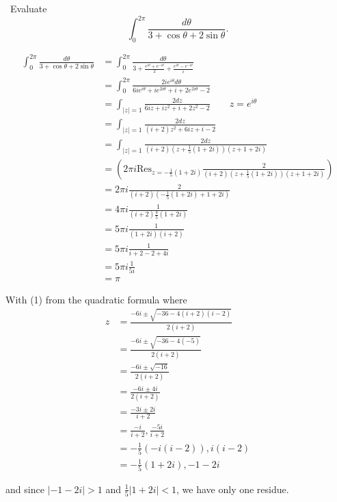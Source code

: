 \documentclass[12pt]{Homework}
\newcommand{\res}{\text{Res}}
\begin{document}
\begin{problem} $\,$
Evaluate $$\int_0^{2\pi}\frac{d\theta}{3+\cos\theta+2\sin\theta}.$$
\end{problem}


\begin{solution}$\,$
\begin{align*}
    \int_0^{2\pi}\frac{d\theta}{3+\cos\theta+2\sin\theta}&=\int_0^{2\pi}\frac{d\theta}{3+\frac{e^{i\theta}+e^{-i\theta}}{2}+\frac{e^{i\theta}-e^{-i\theta}}{i}}\\
    &=\int_0^{2\pi}\frac{2ie^{i\theta}d\theta}{6ie^{i\theta}+ie^{2i\theta}+i+2e^{2i\theta}-2}\\
    &=\int_{|z|=1}\frac{2dz}{6iz+iz^2+i+2z^2-2}\qquad z=e^{i\theta}\\
    &=\int_{|z|=1}\frac{2dz}{(i+2)z^2+6iz+i-2}\\
    &=\int_{|z|=1}\frac{2dz}{(i+2)\left(z+\frac{1}{5}(1+2i)\right)(z+1+2i)}\tag{1}\\
    &=\left(2\pi i\res_{z=-\frac{1}{5}(1+2i)}\frac{2}{(i+2)\left(z+\frac{1}{5}(1+2i)\right)(z+1+2i)}\right)\\
    &=2\pi i \frac{2}{(i+2)\left(-\frac{1}{5}(1+2i)+1+2i\right)}\\
    &=4\pi i\frac{1}{(i+2)\frac{4}{5}(1+2i)}\\
    &=5\pi i\frac{1}{(1+2i)(i+2)}\\
    &=5\pi i\frac{1}{i+2-2+4i}\\
    &=5\pi i\frac{1}{5i}\\
    &=\pi
\end{align*}

With (1) from the quadratic formula where \begin{align*}
    z&=\frac{-6i\pm\sqrt{-36-4(i+2)(i-2)}}{2(i+2)}\\
    &=\frac{-6i\pm\sqrt{-36-4(-5)}}{2(i+2)}\\
    &=\frac{-6i\pm\sqrt{-16}}{2(i+2)}\\
    &=\frac{-6i\pm 4i}{2(i+2)}\\
    &=\frac{-3i\pm 2i}{i+2}\\
    &=\frac{-i}{i+2},\frac{-5i}{i+2}\\
    &=-\frac{1}{5}(-i(i-2)),i(i-2)\\
    &=-\frac{1}{5}(1+2i),-1-2i
\end{align*}

and since $|-1-2i|>1$ and $\frac{1}{5}|1+2i|<1$, we have only one residue.
\end{solution}
\newpage
\end{document}

